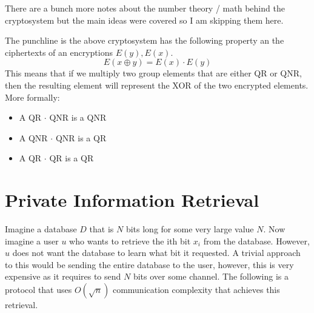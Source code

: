 \documentclass[11pt]{article}
\begin{document}
There are a bunch more notes about the number theory / math behind the cryptosystem but the main ideas were covered so I am skipping them here.
\bigskip

The punchline is the above cryptosystem has the following property an the ciphertexts of an encryptions $E(y),E(x)$.
$$E(x \oplus y) = E(x) \cdot E(y)$$
This means that if we multiply two group elements that are either QR or QNR, then the resulting element will represent the XOR of the two encrypted elements. More formally:
\begin{itemize}
    \item A QR $\cdot$ QNR is a QNR
    \item A QNR $\cdot$ QNR is a QR
    \item A QR $\cdot$ QR is a QR
\end{itemize}

\section{Private Information Retrieval}
Imagine a database $D$ that is $N$ bits long for some very large value $N$. Now imagine a user $u$ who wants to retrieve the ith bit $x_i$ from the database. However, $u$ does not want the database to learn what bit it requested. A trivial approach to this would be sending the entire database to the user, however, this is very expensive as it requires to send $N$ bits over some channel. The following is a protocol that uses $O(\sqrt{n})$ communication complexity that achieves this retrieval.
\end{document}
